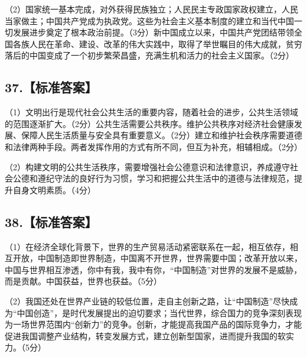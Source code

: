 \documentclass[UTF8,11pt]{ctexart}
\begin{document}
（2）国家统一基本完成，对外获得民族独立；人民民主专政国家政权建立，人民当家做主；中国共产党成为执政党。这些为社会主义基本制度的建立和当代中国一切发展进步奠定了根本政治前提。（3分）新中国成立以来，中国共产党团结带领全国各族人民在革命、建设、改革的伟大实践中，取得了举世瞩目的伟大成就，贫穷落后的中国变成了一个初步繁荣昌盛，充满生机和活力的社会主义国家。（2分）


\subsection*{37.【标准答案】}

（1）文明出行是现代社会公共生活的重要内容，随着社会的进步，公共生活领域的范围逐渐扩大。（2分）公共生活需要公共秩序。维护公共秩序对经济社会健康发展、保障人民生活质量与安全具有重要意义。（2分）建立和维护社会秩序需要道德和法律两种手段。两者发挥作用的方式有所不同，但互为补充，相辅相成。（2分）


（2）构建文明的公共生活秩序，需要增强社会公德意识和法律意识，养成遵守社会公德和遵纪守法的良好行为习惯，学习和把握公共生活中的道德与法律规范，提升自身文明素质。（4分）


\subsection*{38.【标准答案】}

（1）在经济全球化背景下，世界的生产贸易活动紧密联系在一起，相互依存，相互开放，中国制造即世界制造，中国离不开世界，世界需要中国；改革开放以来，中国与世界相互渗透，你中有我，我中有你，“中国制造”对世界的发展不是威胁，而是贡献。中国获益，世界也获益。（5分）


（2）我国还处在世界产业链的较低位置，走自主创新之路，让“中国制造”尽快成为“中国创造”，是时代发展提出的迫切要求；当代世界，综合国力的竞争深刻表现为一场世界范围内“创新力”的竞争。创新，才能提高我国产品的国际竞争力，才能促进我国调整产业结构，转变发展方式，建立创新型国家，进而提升我国的软实力。（5分）
\end{document}
